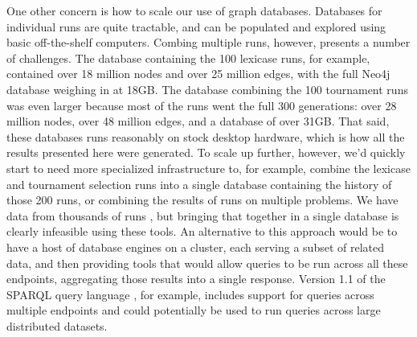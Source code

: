One other concern is how to scale our use of graph databases. Databases for individual runs are quite tractable,
and can be populated and explored using basic off-the-shelf computers. Combing multiple runs, however, presents a
number of challenges. The database containing the 100 lexicase runs, for example, contained over 18 million nodes 
and over 25 million edges, with the full Neo4j database weighing in at 18GB. The database combining the 100 tournament
runs was even larger because most of the runs went the full 300 generations: over 28 million nodes, over 48 million edges,
and a database of over 31GB. That said, these databases runs reasonably on stock desktop 
hardware, which is how all the results presented here were generated. To scale up further, however, 
we'd quickly start to need more specialized infrastructure to, for example, combine the 
lexicase and tournament selection runs into a single database containing the history of those 200 runs, or combining
the results of runs on multiple problems. We have data from thousands of runs \citep{Helmuth:2015:GPTP}, but bringing
that together in a single database is clearly infeasible using these tools. An alternative to this approach would be
to have a host of database engines on a cluster, each serving a subset of related data, and then providing tools
that would allow queries to be run across all these endpoints, aggregating those results into a single response. Version
1.1 of the SPARQL query language \citep{wiki:SPARQL}, for example, includes support for queries across multiple endpoints
and could potentially be used to run queries across large distributed datasets.

